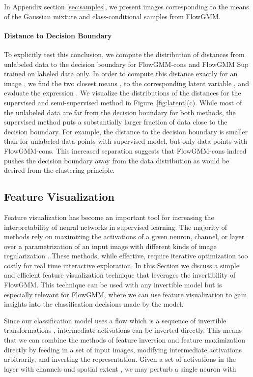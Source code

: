 \documentclass{article}
\newcommand{\method}{FlowGMM\xspace}
\newcommand{\methodcons}{FlowGMM-cons\xspace}
\begin{document}
In Appendix section \ref{sec:samples}, we present images corresponding to the means of the Gaussian mixture and class-conditional samples from \method.

\paragraph{Distance to Decision Boundary}
To explicitly test this conclusion, we compute the distribution of distances from unlabeled data
to the decision boundary for \methodcons and \method Sup trained 
on labeled data only. 
In order to compute this distance exactly for an image , we find the two
closest means ,  to the corresponding latent variable
, and evaluate the expression
.
We visualize the distributions of the distances for the supervised 
and semi-supervised method in Figure~\ref{fig:latent}(c). 
While most of the unlabeled data are far from the decision boundary
for both methods, the supervised method puts a substantially larger
fraction of data close to the decision boundary. 
For example, the distance to the decision boundary is smaller than
 for  unlabeled data points with supervised model, but 
only  data points with \methodcons. This increased separation suggests that
\methodcons indeed pushes the decision 
boundary away from the data distribution as would be desired from the
clustering principle.

\subsection{Feature Visualization}
\label{sec:analysis_features}

Feature visualization has become an important tool for increasing the interpretability of neural networks in supervised learning. 
The majority of methods rely on maximizing the activations of a given neuron, channel, or layer over a parametrization of an input image with different kinds of image regularization \citep{szegedy2013intriguing,olah2017feature,mahendran2015understanding}. 
These methods, while effective, require iterative optimization too costly for real time interactive exploration.
In this Section we discuss a simple and efficient feature visualization technique that leverages the invertibility of \method. 
This technique can be used with any invertible model but is especially relevant for \method, where we can use feature visualization to gain insights into the classification decisions made by the model.  

Since our classification model uses a flow which is a sequence of invertible transformations , intermediate activations can be inverted directly. This means that we can combine the methods of feature inversion and feature maximization directly by feeding in a set of input images, modifying intermediate activations arbitrarily, and inverting the representation. Given a set of activations in the  layer  with channels  and spatial extent , we may perturb a single neuron with 
 
\end{document}
